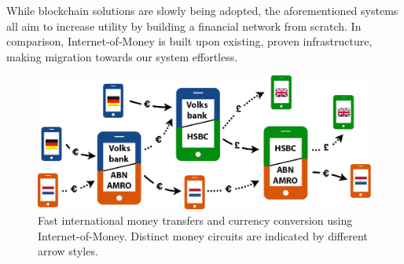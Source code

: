 While blockchain solutions are slowly being adopted, the aforementioned systems all aim to increase utility by building a financial network from scratch.
In comparison, Internet-of-Money is built upon existing, proven infrastructure, making migration towards our system effortless.




\begin{figure}[t]
	\centering
	\includegraphics[width=1\textwidth]{iom/assets/internet_of_money_network.png}
	\caption{Fast international money transfers and currency conversion using Internet-of-Money. Distinct money circuits are indicated by different arrow styles.}
	\label{fig:internet_of_money_network}
\end{figure}


